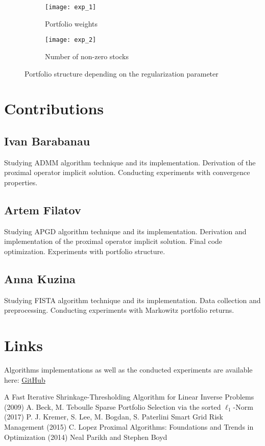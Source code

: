 \documentclass[a4paper]{article}
\begin{document}
\begin{figure}[!h]
\centering
\begin{subfigure}{.5\textwidth}
  \centering
  \texttt{[image: exp\_1]}
  \caption{Portfolio weights}
\end{subfigure}%
\begin{subfigure}{.5\textwidth}
  \centering
  \texttt{[image: exp\_2]}
  \caption{Number of non-zero stocks}
\end{subfigure}
\caption{\label{fig:structure}Portfolio structure depending on the regularization parameter}
\end{figure}


\newpage
\section{Contributions}
\subsection{Ivan Barabanau}
Studying ADMM algorithm technique and its implementation. Derivation of the proximal operator implicit solution. Conducting experiments with convergence properties.
\subsection{Artem Filatov}
Studying APGD algorithm technique and its implementation. Derivation and implementation of the proximal operator implicit solution. Final code optimization. Experiments with portfolio structure.
\subsection{Anna Kuzina}
Studying FISTA algorithm technique and its implementation. Data collection and preprocessing. Conducting experiments with Markowitz portfolio returns.

\section{Links}
Algorithms implementations as well as the conducted experiments are available here: \href{https://github.com/FilatovArtm/optMarkowitz}{GitHub}
\begin{thebibliography}{} %
 A Fast Iterative Shrinkage-Thresholding Algorithm for Linear Inverse Problems (2009)
\newblock A. Beck, M. Teboulle
 Sparse Portfolio Selection via the sorted $\ell_1$-Norm (2017)
\newblock P. J. Kremer, S. Lee, M. Bogdan, S. Paterlini
 Smart Grid Risk Management (2015)
\newblock C. Lopez
 Proximal Algorithms: Foundations and Trends in Optimization (2014)
\newblock Neal Parikh and Stephen Boyd
\end{thebibliography}
\end{document}
